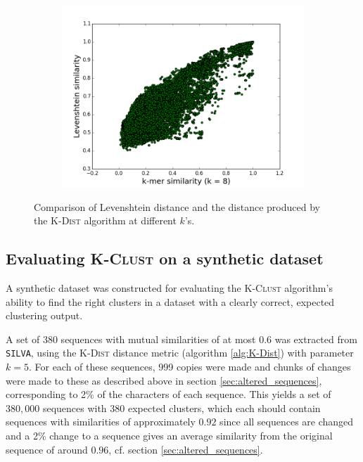 \begin{figure}[H]
  \centering
  \begin{subfigure}[b]{0.5\textwidth}
    \includegraphics[scale=0.34]{graphics/k8.png}
  \end{subfigure}
  \caption{Comparison of Levenshtein distance and the distance produced by the \textsc{K-Dist} algorithm at different $k$'s.}
  \label{fig:Levenshtein_vs_KDist}
\end{figure}

\subsection{Evaluating \textsc{K-Clust} on a synthetic dataset}
\label{sec:synth_dataset}

A synthetic dataset was constructed for evaluating the \textsc{K-Clust}
algorithm's ability to find the right clusters in a dataset with a clearly
correct, expected clustering output.

A set of 380 sequences with mutual similarities of at most 0.6 was extracted
from \texttt{SILVA}, using the \textsc{K-Dist} distance metric (algorithm
\ref{alg:K-Dist}) with parameter $k=5$. For each of these sequences, 999 copies
were made and chunks of changes were made to these as described above in
section \ref{sec:altered_sequences}, corresponding to 2\% of the characters of
each sequence. This yields a set of $380,000$ sequences with 380 expected
clusters, which each should contain sequences with similarities of
approximately $0.92$ since all sequences are changed and a 2\% change to a
sequence gives an average similarity from the original sequence of around
$0.96$, cf. section \ref{sec:altered_sequences}.

